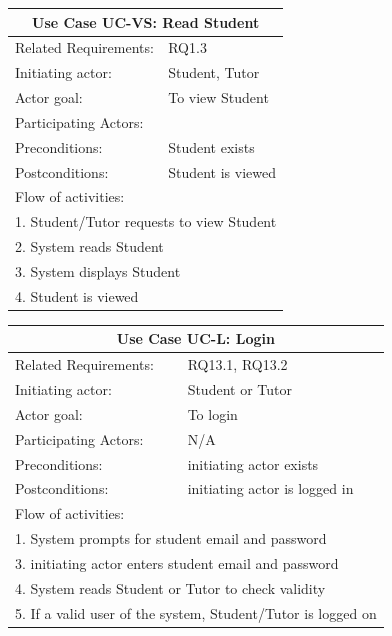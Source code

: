 \documentclass[12pt]{article}
\begin{document}
{		\begin{tabular}{| l | p{10cm}| }
			\hline\multicolumn{2}{|c|}{ \textbf{Use Case UC-VS: Read Student}} \\ \hline
			Related Requirements: & RQ1.3 \\ \hline
			Initiating actor: & Student, Tutor\\ \hline
			Actor goal: & To view Student\\ \hline
			Participating Actors: & \\ \hline
			Preconditions: &Student exists\\ \hline
			Postconditions: & Student is viewed\\ \hline
			\multicolumn{2}{|l|}{Flow of activities:}\\ \hline
			\multicolumn{2}{|p{15cm}|}{1. Student/Tutor requests to view Student}\\
			\multicolumn{2}{|p{15cm}|}{2. System reads Student}\\
			\multicolumn{2}{|p{15cm}|}{3. System displays Student}\\
			\multicolumn{2}{|l|}{4. Student is viewed}
			\\ \hline
		\end{tabular}


		\begin{tabular}{| l | p{10cm}| }
			\hline\multicolumn{2}{|c|}{ \textbf{Use Case UC-L: Login}} \\ \hline
			Related Requirements: & RQ13.1, RQ13.2\\ \hline
			Initiating actor: & Student or Tutor \\ \hline
			Actor goal: & To login\\ \hline
			Participating Actors: &N/A\\ \hline
			Preconditions: &initiating actor exists\\ \hline
			Postconditions: & initiating actor is logged in\\ \hline
			\multicolumn{2}{|l|}{Flow of activities:}\\ \hline
			\multicolumn{2}{|p{15cm}|}{1. System prompts for student email and password}\\
			\multicolumn{2}{|p{15cm}|}{3. initiating actor enters student email and password}\\
			\multicolumn{2}{|l|}{4. System reads Student or Tutor to check validity}\\
			\multicolumn{2}{|l|}{5. If a valid user of the system, Student/Tutor is logged on}	\\
			 \hline
		\end{tabular}



}
\end{document}
